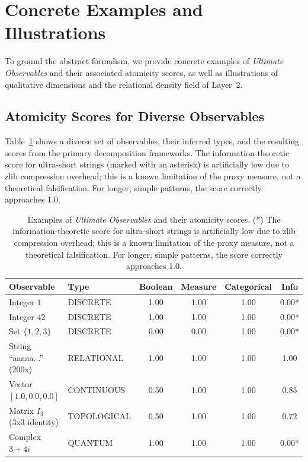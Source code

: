 \section{Concrete Examples and Illustrations}
\label{sec:examples}

To ground the abstract formalism, we provide concrete examples of \textit{Ultimate Observables} and their associated atomicity scores, as well as illustrations of qualitative dimensions and the relational density field of Layer~2.

\subsection{Atomicity Scores for Diverse Observables}

Table~\ref{tab:examples} shows a diverse set of observables, their inferred types, and the resulting scores from the primary decomposition frameworks. The information-theoretic score for ultra-short strings (marked with an asterisk) is artificially low due to zlib compression overhead; this is a known limitation of the proxy measure, not a theoretical falsification. For longer, simple patterns, the score correctly approaches 1.0.

\begin{table}[htbp]
    \centering
    \begin{tabular}{l l c c c c}
        \toprule
        \textbf{Observable} & \textbf{Type} & \textbf{Boolean} & \textbf{Measure} & \textbf{Categorical} & \textbf{Info} \\
        \midrule
        Integer $1$ & DISCRETE & 1.00 & 1.00 & 1.00 & 0.00* \\
        Integer $42$ & DISCRETE & 1.00 & 1.00 & 1.00 & 0.00* \\
        Set $\{1,2,3\}$ & DISCRETE & 0.00 & 0.00 & 1.00 & 0.00* \\
        String ``aaaaa...'' (200x) & RELATIONAL & 1.00 & 1.00 & 1.00 & 1.00 \\
        Vector $[1.0, 0.0, 0.0]$ & CONTINUOUS & 0.50 & 1.00 & 1.00 & 0.85 \\
        Matrix $I_3$ (3x3 identity) & TOPOLOGICAL & 0.50 & 1.00 & 1.00 & 0.72 \\
        Complex $3+4i$ & QUANTUM & 1.00 & 1.00 & 1.00 & 0.00* \\
        \bottomrule
    \end{tabular}
    \caption{Examples of \textit{Ultimate Observables} and their atomicity scores. (*) The information-theoretic score for ultra-short strings is artificially low due to zlib compression overhead; this is a known limitation of the proxy measure, not a theoretical falsification. For longer, simple patterns, the score correctly approaches 1.0.}
    \label{tab:examples}
\end{table}

